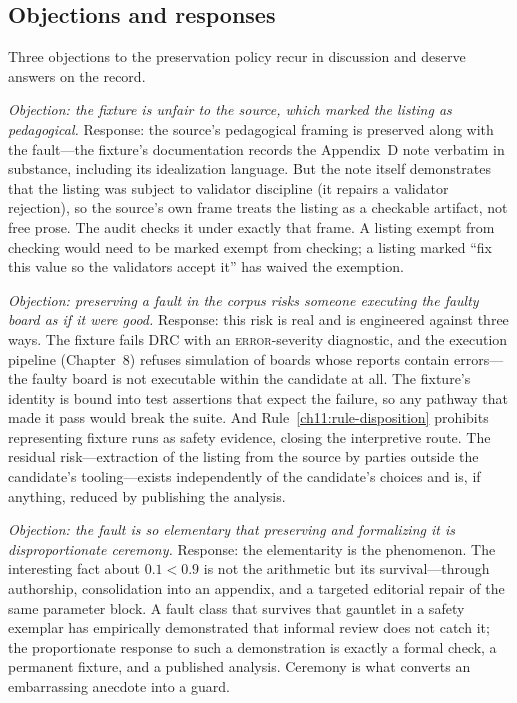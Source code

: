 \subsection{Objections and responses}\label{ch11:objections}

Three objections to the preservation policy recur in discussion and deserve answers on the record.

\emph{Objection: the fixture is unfair to the source, which marked the listing as pedagogical.} Response: the source's pedagogical framing is preserved along with the fault---the fixture's documentation records the Appendix~D note verbatim in substance, including its idealization language. But the note itself demonstrates that the listing was subject to validator discipline (it repairs a validator rejection), so the source's own frame treats the listing as a checkable artifact, not free prose. The audit checks it under exactly that frame. A listing exempt from checking would need to be marked exempt from checking; a listing marked ``fix this value so the validators accept it'' has waived the exemption.

\emph{Objection: preserving a fault in the corpus risks someone executing the faulty board as if it were good.} Response: this risk is real and is engineered against three ways. The fixture fails DRC with an \textsc{error}-severity diagnostic, and the execution pipeline (Chapter~8) refuses simulation of boards whose reports contain errors---the faulty board is not executable within the candidate at all. The fixture's identity is bound into test assertions that expect the failure, so any pathway that made it pass would break the suite. And Rule~\ref{ch11:rule-disposition} prohibits representing fixture runs as safety evidence, closing the interpretive route. The residual risk---extraction of the listing from the source by parties outside the candidate's tooling---exists independently of the candidate's choices and is, if anything, reduced by publishing the analysis.

\emph{Objection: the fault is so elementary that preserving and formalizing it is disproportionate ceremony.} Response: the elementarity is the phenomenon. The interesting fact about $0.1<0.9$ is not the arithmetic but its survival---through authorship, consolidation into an appendix, and a targeted editorial repair of the same parameter block. A fault class that survives that gauntlet in a safety exemplar has empirically demonstrated that informal review does not catch it; the proportionate response to such a demonstration is exactly a formal check, a permanent fixture, and a published analysis. Ceremony is what converts an embarrassing anecdote into a guard.

